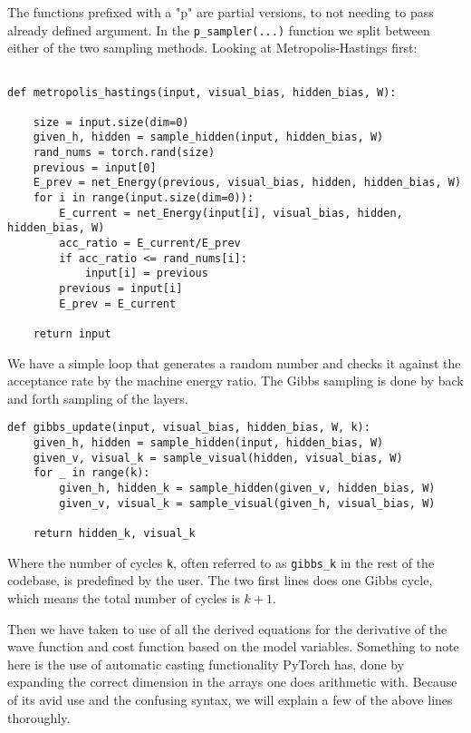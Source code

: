The functions prefixed with a "p" are partial versions, to not needing to pass already defined argument. In the \texttt{p_sampler(...)} function we split between either of the two sampling methods. Looking at Metropolis-Hastings first:

\begin{verbatim}

def metropolis_hastings(input, visual_bias, hidden_bias, W):
    
    size = input.size(dim=0)
    given_h, hidden = sample_hidden(input, hidden_bias, W)
    rand_nums = torch.rand(size)
    previous = input[0]
    E_prev = net_Energy(previous, visual_bias, hidden, hidden_bias, W)
    for i in range(input.size(dim=0)):
        E_current = net_Energy(input[i], visual_bias, hidden, hidden_bias, W)
        acc_ratio = E_current/E_prev
        if acc_ratio <= rand_nums[i]:
            input[i] = previous
        previous = input[i]
        E_prev = E_current

    return input
\end{verbatim}

We have a simple loop that generates a random number and checks it against the acceptance rate by the machine energy ratio. The Gibbs sampling is done by back and forth sampling of the layers.

\begin{verbatim}
def gibbs_update(input, visual_bias, hidden_bias, W, k):
    given_h, hidden = sample_hidden(input, hidden_bias, W)
    given_v, visual_k = sample_visual(hidden, visual_bias, W)
    for _ in range(k):
        given_h, hidden_k = sample_hidden(given_v, hidden_bias, W)
        given_v, visual_k = sample_visual(given_h, visual_bias, W)
    
    return hidden_k, visual_k
\end{verbatim}

Where the number of cycles \texttt{k}, often referred to as \texttt{gibbs_k} in the rest of the codebase, is predefined by the user. The two first lines does one Gibbs cycle, which means the total number of cycles is $k+1$.

Then we have taken to use of all the derived equations for the derivative of the wave function and cost function based on the model variables. Something to note here is the use of automatic casting functionality PyTorch has, done by expanding the correct dimension in the arrays one does arithmetic with. Because of its avid use and the confusing syntax, we will explain a few of the above lines thoroughly.

